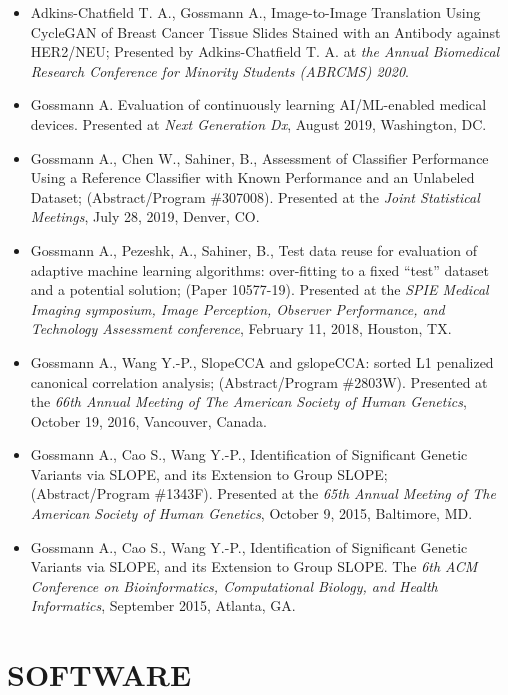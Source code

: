 \documentclass[overlapped, line, 10pt]{res} %
\begin{document}
\begin{resume}
\begin{itemize}
  \item 
    Adkins-Chatfield T. A., Gossmann A., Image-to-Image Translation Using CycleGAN of Breast Cancer Tissue Slides Stained with an Antibody against HER2/NEU;
    Presented by Adkins-Chatfield T. A. at \textit{the Annual Biomedical Research Conference for Minority Students (ABRCMS) 2020}.
  \item 
    Gossmann A. Evaluation of continuously learning AI/ML-enabled medical devices.
    Presented at \textit{Next Generation Dx},
    August 2019, Washington, DC.
  \item
    Gossmann A., Chen W., Sahiner, B., Assessment of Classifier Performance Using a Reference Classifier with Known Performance and an Unlabeled Dataset;
    (Abstract/Program \#307008).
    Presented at the \textit{Joint Statistical Meetings},
    July 28, 2019, Denver, CO.
  \item
    Gossmann A., Pezeshk, A., Sahiner, B., Test data reuse for evaluation of adaptive machine learning algorithms: over-fitting to a fixed ``test'' dataset and a potential solution;
    (Paper 10577-19).
    Presented at the \textit{SPIE Medical Imaging symposium, Image Perception, Observer Performance, and Technology Assessment conference},
    February 11, 2018, Houston, TX.
  \item
    Gossmann A., Wang Y.-P., SlopeCCA and gslopeCCA: sorted L1 penalized canonical correlation analysis;
    (Abstract/Program \#2803W).
    Presented at the \textit{66th Annual Meeting of The American Society of Human Genetics},
    October 19, 2016, Vancouver, Canada.
  \item
    Gossmann A., Cao S., Wang Y.-P., Identification of Significant Genetic Variants via SLOPE, and its Extension to Group SLOPE;
    (Abstract/Program \#1343F).
    Presented at the \textit{65th Annual Meeting of The American Society of Human Genetics},
    October 9, 2015, Baltimore, MD.
  \item
    Gossmann A., Cao S., Wang Y.-P., Identification of Significant Genetic Variants via SLOPE, and its Extension to Group SLOPE.
    The \textit{6th ACM Conference on Bioinformatics, Computational Biology, and Health Informatics},
    September 2015, Atlanta, GA.
\end{itemize}


\section{SOFTWARE}


\end{resume}
\end{document}
